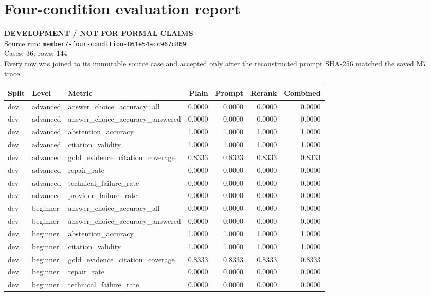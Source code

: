 \documentclass[10pt]{article}
\begin{document}
\section*{Four-condition evaluation report}
\textbf{DEVELOPMENT / NOT FOR FORMAL CLAIMS}\\
Source run: \texttt{member7-four-condition-861e54acc967c869}\\
Cases: 36; rows: 144\\
Every row was joined to its immutable source case and accepted only after the reconstructed prompt SHA-256 matched the saved M7 trace.
\begin{longtable}{lllrrrr}
\toprule
Split & Level & Metric & Plain & Prompt & Rerank & Combined \\
\midrule
\endhead
dev & advanced & answer\_choice\_accuracy\_all & 0.0000 & 0.0000 & 0.0000 & 0.0000 \\
dev & advanced & answer\_choice\_accuracy\_answered & 0.0000 & 0.0000 & 0.0000 & 0.0000 \\
dev & advanced & abstention\_accuracy & 1.0000 & 1.0000 & 1.0000 & 1.0000 \\
dev & advanced & citation\_validity & 1.0000 & 1.0000 & 1.0000 & 1.0000 \\
dev & advanced & gold\_evidence\_citation\_coverage & 0.8333 & 0.8333 & 0.8333 & 0.8333 \\
dev & advanced & repair\_rate & 0.0000 & 0.0000 & 0.0000 & 0.0000 \\
dev & advanced & technical\_failure\_rate & 0.0000 & 0.0000 & 0.0000 & 0.0000 \\
dev & advanced & provider\_failure\_rate & 0.0000 & 0.0000 & 0.0000 & 0.0000 \\
dev & beginner & answer\_choice\_accuracy\_all & 0.0000 & 0.0000 & 0.0000 & 0.0000 \\
dev & beginner & answer\_choice\_accuracy\_answered & 0.0000 & 0.0000 & 0.0000 & 0.0000 \\
dev & beginner & abstention\_accuracy & 1.0000 & 1.0000 & 1.0000 & 1.0000 \\
dev & beginner & citation\_validity & 1.0000 & 1.0000 & 1.0000 & 1.0000 \\
dev & beginner & gold\_evidence\_citation\_coverage & 0.8333 & 0.8333 & 0.8333 & 0.8333 \\
dev & beginner & repair\_rate & 0.0000 & 0.0000 & 0.0000 & 0.0000 \\
dev & beginner & technical\_failure\_rate & 0.0000 & 0.0000 & 0.0000 & 0.0000 \\

\end{longtable}
\end{document}
